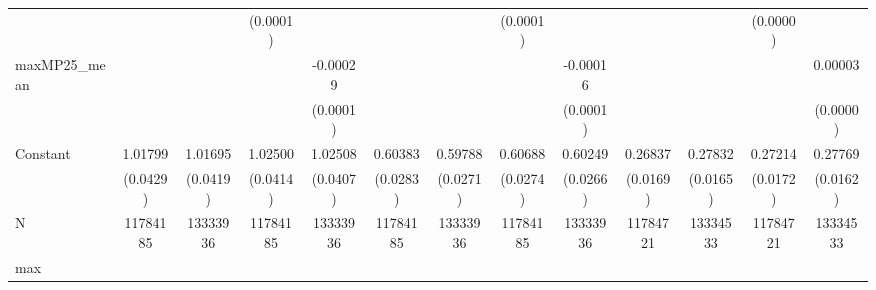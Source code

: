 {\begin{tabular}{l*{12}{c}}
            &                     &                     &    (0.0001)         &                     &                     &                     &    (0.0001)         &                     &                     &                     &    (0.0000)         &                     \\
maxMP25\_mean&                     &                     &                     &    -0.00029\sym{**} &                     &                     &                     &    -0.00016\sym{*}  &                     &                     &                     &     0.00003         \\
            &                     &                     &                     &    (0.0001)         &                     &                     &                     &    (0.0001)         &                     &                     &                     &    (0.0000)         \\
Constant    &     1.01799\sym{***}&     1.01695\sym{***}&     1.02500\sym{***}&     1.02508\sym{***}&     0.60383\sym{***}&     0.59788\sym{***}&     0.60688\sym{***}&     0.60249\sym{***}&     0.26837\sym{***}&     0.27832\sym{***}&     0.27214\sym{***}&     0.27769\sym{***}\\
            &    (0.0429)         &    (0.0419)         &    (0.0414)         &    (0.0407)         &    (0.0283)         &    (0.0271)         &    (0.0274)         &    (0.0266)         &    (0.0169)         &    (0.0165)         &    (0.0172)         &    (0.0162)         \\
\midrule
N           &    11784185         &    13333936         &    11784185         &    13333936         &    11784185         &    13333936         &    11784185         &    13333936         &    11784721         &    13334533         &    11784721         &    13334533         \\
max         &                     &                     &                     &                     &                     &                     &                     &                     &                     &                     &                     &                     \\
\bottomrule
\end{tabular}
}
